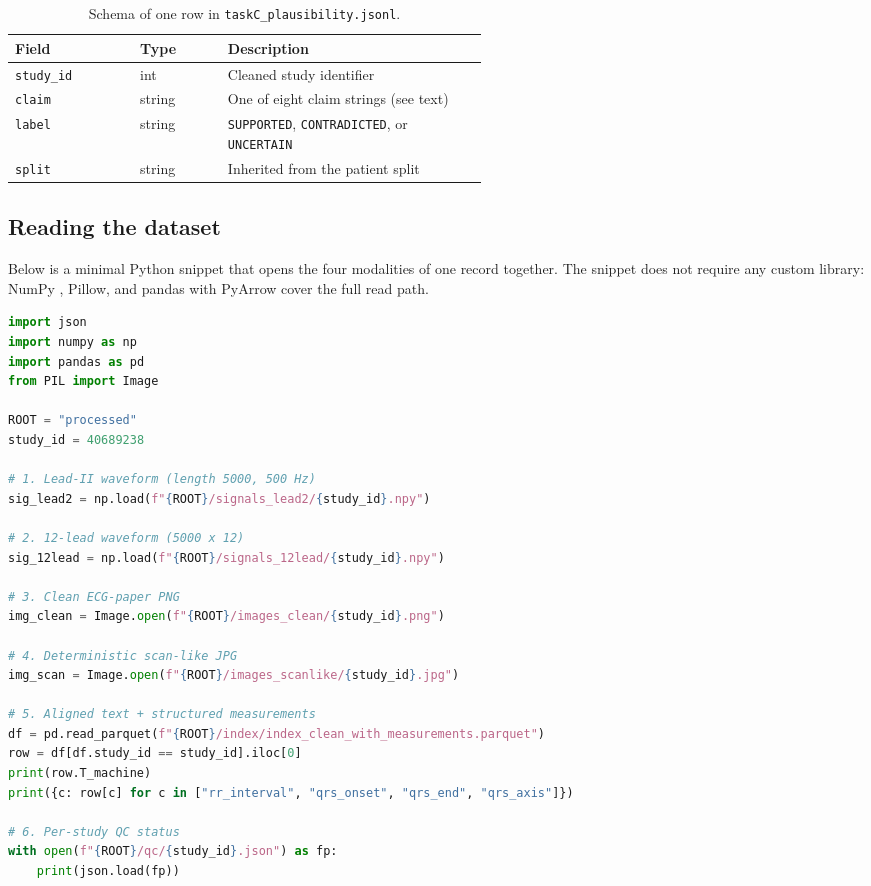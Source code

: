 \documentclass[12pt,letterpaper]{article}
\begin{document}
\begin{table}[!ht]
\centering
\caption{Schema of one row in \texttt{taskC\_plausibility.jsonl}.}
\label{tab:taskC_schema}
\renewcommand{\arraystretch}{1.2}
\begin{tabular}{l l p{0.55\linewidth}}
\toprule
Field & Type & Description \\
\midrule
\texttt{study\_id} & int    & Cleaned study identifier \\
\texttt{claim}     & string & One of eight claim strings (see text) \\
\texttt{label}     & string & \texttt{SUPPORTED}, \texttt{CONTRADICTED}, or \texttt{UNCERTAIN} \\
\texttt{split}     & string & Inherited from the patient split \\
\bottomrule
\end{tabular}
\end{table}

\subsection*{Reading the dataset}

Below is a minimal Python snippet that opens the four modalities of one record together. The snippet does not require any custom library: NumPy \cite{harris2020array}, Pillow, and pandas with PyArrow \cite{vaynberg2020apache} cover the full read path.

\begin{lstlisting}[caption={Reading one Tri-Modal-ECG record across all four modalities.},label={lst:reader},language=Python]
import json
import numpy as np
import pandas as pd
from PIL import Image

ROOT = "processed"
study_id = 40689238

# 1. Lead-II waveform (length 5000, 500 Hz)
sig_lead2 = np.load(f"{ROOT}/signals_lead2/{study_id}.npy")

# 2. 12-lead waveform (5000 x 12)
sig_12lead = np.load(f"{ROOT}/signals_12lead/{study_id}.npy")

# 3. Clean ECG-paper PNG
img_clean = Image.open(f"{ROOT}/images_clean/{study_id}.png")

# 4. Deterministic scan-like JPG
img_scan = Image.open(f"{ROOT}/images_scanlike/{study_id}.jpg")

# 5. Aligned text + structured measurements
df = pd.read_parquet(f"{ROOT}/index/index_clean_with_measurements.parquet")
row = df[df.study_id == study_id].iloc[0]
print(row.T_machine)
print({c: row[c] for c in ["rr_interval", "qrs_onset", "qrs_end", "qrs_axis"]})

# 6. Per-study QC status
with open(f"{ROOT}/qc/{study_id}.json") as fp:
    print(json.load(fp))
\end{lstlisting}
\end{document}
